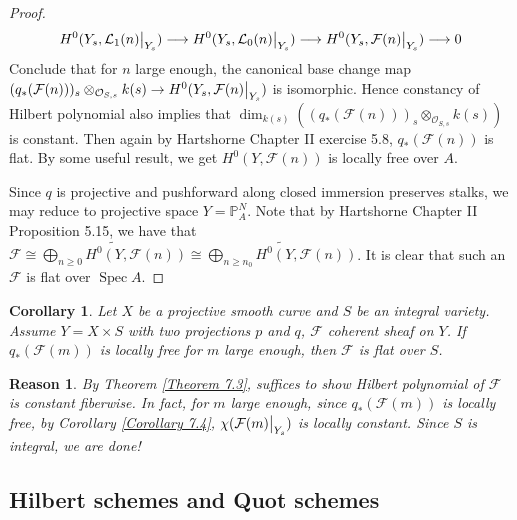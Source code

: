 \documentclass{ctexart}
\newtheorem{reason}{Reason}[section]
\newtheorem{corollary}{Corollary}[section]
\newcommand{\spec}{\operatorname{Spec}}
\begin{document}
\begin{proof}
\begin{equation}
        H^{0}(Y_{s}, \mathcal{L}_{1}(n)\big{|}_{Y_{s}}) \longrightarrow H^{0}(Y_{s}, \mathcal{L}_{0}(n)\big{|}_{Y_{s}}) \longrightarrow H^{0}(Y_{s}, \mathcal{F}(n)\big{|}_{Y_{s}}) \longrightarrow 0
    \end{equation}
    Conclude that for $n$ large enough, the canonical base change map $(q_{\ast}(\mathcal{F}(n)))_{s} \otimes_{\mathcal{O}_{S, s}} k(s) \rightarrow H^{0}(Y_{s}, \mathcal{F}(n)\big{|}_{Y_{s}})$ is isomorphic.
    Hence constancy of Hilbert polynomial also implies that $\dim_{k(s)} ((q_{\ast}(\mathcal{F}(n)))_{s} \otimes_{\mathcal{O}_{S, s}} k(s))$ is constant.
    Then again by Hartshorne Chapter II exercise 5.8, $q_{\ast}(\mathcal{F}(n))$ is flat.
    By some useful result, we get $H^{0}(Y, \mathcal{F}(n))$ is locally free over $A$.
    \par
    Since $q$ is projective and pushforward along closed immersion preserves stalks, we may reduce to projective space $Y = \mathbb{P}_{A}^{N}$.
    Note that by Hartshorne Chapter II Proposition 5.15, we have that $\mathcal{F} \cong \widetilde{\bigoplus_{n \ge 0} H^{0}(Y, \mathcal{F}(n))} \cong \widetilde{\bigoplus_{n \ge n_{0}} H^{0}(Y, \mathcal{F}(n))}$.
    It is clear that such an $\mathcal{F}$ is flat over $\spec A$.
\end{proof}
\begin{corollary}
    Let $X$ be a projective smooth curve and $S$ be an integral variety.
    Assume $Y = X \times S$ with two projections $p$ and $q$, $\mathcal{F}$ coherent sheaf on $Y$.
    If $q_{\ast}(\mathcal{F}(m))$ is locally free for $m$ large enough, then $\mathcal{F}$ is flat over $S$.
    \label{Corollary 7.7}
\end{corollary}
\begin{reason}
    By Theorem \ref{Theorem 7.3}, suffices to show Hilbert polynomial of $\mathcal{F}$ is constant fiberwise.
    In fact, for $m$ large enough, since $q_{\ast}(\mathcal{F}(m))$ is locally free,
    by Corollary \ref{Corollary 7.4}, $\chi(\mathcal{F}(m)\big{|}_{Y_{s}})$ is locally constant.
    Since $S$ is integral, we are done!
\end{reason}

\subsection{Hilbert schemes and Quot schemes}
\label{subsection:Moduli_Space_of_Vector_Bundles_Hilbert_schemes_and_Quot_schemes}
\end{document}
